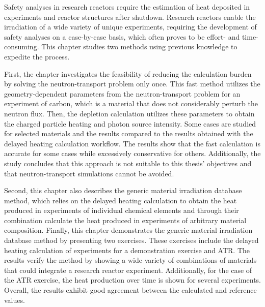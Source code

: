 Safety analyses in research reactors require the estimation of heat deposited in experiments and reactor structures after shutdown.
Research reactors enable the irradiation of a wide variety of unique experiments, requiring the development of safety analyses on a case-by-case basis, which often proves to be effort- and time-consuming.
This chapter studies two methods using previous knowledge to expedite the process.

First, the chapter investigates the feasibility of reducing the calculation burden by solving the neutron-transport problem only once.
This fast method utilizes the geometry-dependent parameters from the neutron-transport problem for an experiment of carbon, which is a material that does not considerably perturb the neutron flux.
Then, the depletion calculation utilizes these parameters to obtain the charged particle heating and photon source intensity.
Some cases are studied for selected materials and the results compared to the results obtained with the delayed heating calculation workflow.
The results show that the fast calculation is accurate for some cases while excessively conservative for others.
Additionally, the study concludes that this approach is not suitable to this thesis' objectives and that neutron-transport simulations cannot be avoided.

Second, this chapter also describes the generic material irradiation database method, which relies on the delayed heating calculation to obtain the heat produced in experiments of individual chemical elements and through their combination calculate the heat produced in experiments of arbitrary material composition.
Finally, this chapter demonstrates the generic material irradiation database method by presenting two exercises.
These exercises include the delayed heating calculation of experiments for a demonstration exercise and ATR.
The results verify the method by showing a wide variety of combinations of materials that could integrate a research reactor experiment.
Additionally, for the case of the ATR exercise, the heat production over time is shown for several experiments.
Overall, the results exhibit good agreement between the calculated and reference values.

